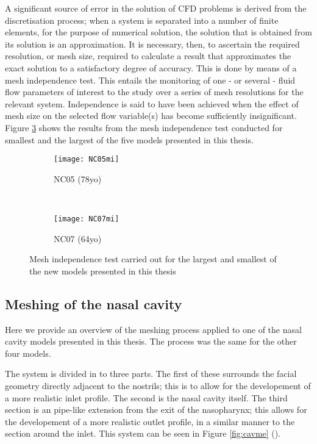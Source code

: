 A significant source of error in the solution of CFD problems is derived from the discretisation process; when a system is separated into a number of finite elements, for the purpose of numerical solution, the solution that is obtained from its solution is an approximation. It is necessary, then, to ascertain the required resolution, or mesh size, required to calculate a result that approximates the exact solution to a satisfactory degree of accuracy. This is done by means of a mesh independence test. This entails the monitoring of one - or several - fluid flow parameters of interest to the study over a series of mesh resolutions for the relevant system. Independence is said to have been achieved when the effect of mesh size on the selected flow variable(s) has become sufficiently insignificant. Figure \ref{fig:mind} shows the results from the mesh independence test conducted for smallest and the largest of the five models presented in this thesis.

\begin{figure}

  \begin{subfigure}[t]{0.5\textwidth}
    \texttt{[image: NC05mi]}
    \caption{NC05 (78yo)}
    \label{fig:mi5}
  \end{subfigure}%
  ~%
  \begin{subfigure}[t]{0.5\textwidth}
    \texttt{[image: NC07mi]}
    \caption{NC07 (64yo)}
    \label{fig:mi7}
  \end{subfigure}
  \caption{Mesh independence test carried out for the largest and smallest of the new models presented in this thesis} \label{fig:mind}

\end{figure} 

\subsection{Meshing of the nasal cavity} 

Here we provide an overview of the meshing process applied to one of the nasal cavity models presented in this thesis. The process was the same for the other four models.

The system is divided in to three parts. The first of these surrounds the facial geometry directly adjacent to the nostrils; this is to allow for the developement of a more realistic inlet profile. The second is the nasal cavity itself. The third section is an pipe-like extension from the exit of the nasopharynx; this allows for the developement of a more realistic outlet profile, in a similar manner to the section around the inlet. This system can be seen in Figure \ref{fig:cavme} ().

